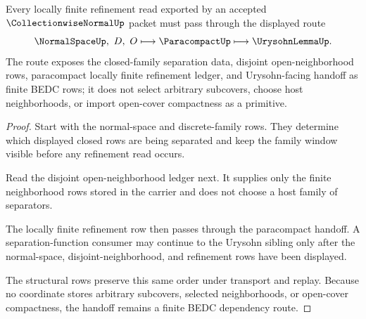 \begin{theorem}
\label{thm:collectionwise-normal-paracompact-handoff}
Every locally finite refinement read exported by an accepted $\CollectionwiseNormalUp$ packet must pass through the displayed route
$$
\NormalSpaceUp,\ D,\ O \longmapsto \ParacompactUp \longmapsto \UrysohnLemmaUp .
$$
The route exposes the closed-family separation data, disjoint open-neighborhood rows, paracompact locally finite refinement ledger, and Urysohn-facing handoff as finite BEDC rows; it does not select arbitrary subcovers, choose host neighborhoods, or import open-cover compactness as a primitive.
\end{theorem}
\begin{proof}
Start with the normal-space and discrete-family rows. They determine which displayed closed rows are being separated and keep the family window visible before any refinement read occurs.

Read the disjoint open-neighborhood ledger next. It supplies only the finite neighborhood rows stored in the carrier and does not choose a host family of separators.

The locally finite refinement row then passes through the paracompact handoff. A separation-function consumer may continue to the Urysohn sibling only after the normal-space, disjoint-neighborhood, and refinement rows have been displayed.

The structural rows preserve this same order under transport and replay. Because no coordinate stores arbitrary subcovers, selected neighborhoods, or open-cover compactness, the handoff remains a finite BEDC dependency route.
\end{proof}



